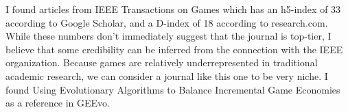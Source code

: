 I found articles from IEEE Transactions on Games which has an h5-index of 33 according to Google Scholar,
and a D-index of 18 according to research.com. 
While these numbers don't immediately suggest that the journal is top-tier, 
I believe that some credibility can be inferred from the connection with the IEEE organization.
Because games are relatively underrepresented in traditional academic research,
we can consider a journal like this one to be very niche.
I found Using Evolutionary Algorithms to Balance Incremental Game Economies~\cite{rogers_using_2023}
as a reference in GEEvo.~\cite{rupp_geevo_2024}
